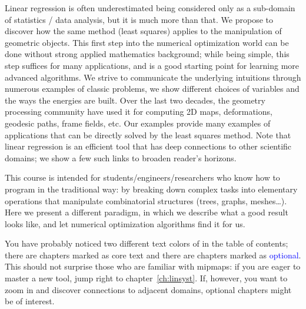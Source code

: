 \documentclass[notitlepage,oneside]{book}
\begin{document}
Linear regression is often underestimated being considered only as a sub-domain of statistics / data analysis, but it is much more than that.
We propose to discover how the same method (least squares) applies to the manipulation of geometric objects.
This first step into the numerical optimization world can be done without strong applied mathematics background;
while being simple, this step suffices for many applications, and is a good starting point for learning more advanced algorithms.
We strive to communicate the underlying intuitions through numerous examples of classic problems, we show different choices of variables and the ways the energies are built.
Over the last two decades, the geometry processing community have used it for computing 2D maps, deformations, geodesic paths, frame fields, etc.
Our examples provide many examples of applications that can be directly solved by the least squares method.
Note that linear regression is an efficient tool that has deep connections to other scientific domains;
we show a few such links to broaden reader's horizons.

\vspace{3mm}

This course is intended for students/engineers/researchers who know how to program in the traditional way:
by breaking down complex tasks into elementary operations that manipulate combinatorial structures (trees, graphs, meshes\dots).
Here we present a different paradigm, in which we describe what a good result looks like, and let numerical optimization algorithms find it for us.

\vspace{3mm}

You have probably noticed two different text colors of in the table of contents; there are chapters marked as \textcolor{ao(english)}{core text} and there are chapters marked as \textcolor{blue}{optional}.
This should not surprise those who are familiar with mipmaps: if you are eager to master a new tool, jump right to chapter~\ref{ch:linsyst}.
If, however, you want to zoom in and discover connections to adjacent domains, optional chapters might be of interest.

\iffalse
\end{document}
